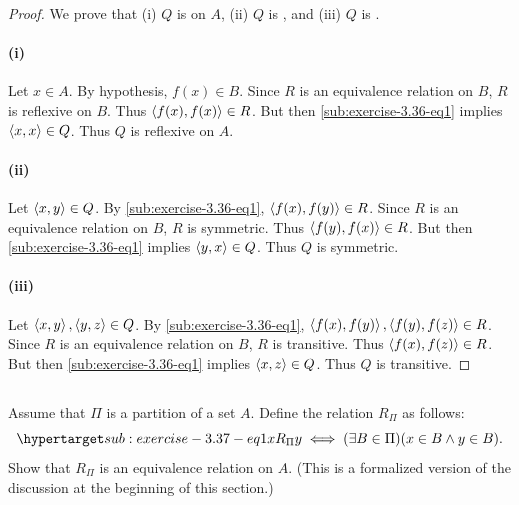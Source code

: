 \documentclass{report}
\begin{document}
  \begin{proof}
    We prove that (i) $Q$ is  on $A$, (ii) $Q$ is
      , and (iii) $Q$ is .

    \paragraph{(i)}%

      Let $x \in A$.
      By hypothesis, $f(x) \in B$.
      Since $R$ is an equivalence relation on $B$, $R$ is reflexive on $B$.
      Thus $\left< f(x), f(x) \right> \in R$.
      But then \eqref{sub:exercise-3.36-eq1} implies $\left< x, x \right> \in Q$.
      Thus $Q$ is reflexive on $A$.

    \paragraph{(ii)}%

      Let $\left< x, y \right> \in Q$.
      By \eqref{sub:exercise-3.36-eq1}, $\left< f(x), f(y) \right> \in R$.
      Since $R$ is an equivalence relation on $B$, $R$ is symmetric.
      Thus $\left< f(y), f(x) \right> \in R$.
      But then \eqref{sub:exercise-3.36-eq1} implies $\left< y, x \right> \in Q$.
      Thus $Q$ is symmetric.

    \paragraph{(iii)}%

      Let $\left< x, y \right>, \left< y, z \right> \in Q$.
      By \eqref{sub:exercise-3.36-eq1},
        $\left< f(x), f(y) \right>, \left< f(y), f(z) \right> \in R$.
      Since $R$ is an equivalence relation on $B$, $R$ is transitive.
      Thus $\left< f(x), f(z) \right> \in R$.
      But then \eqref{sub:exercise-3.36-eq1} implies $\left< x, z \right> \in Q$.
      Thus $Q$ is transitive.

  \end{proof}

\subsection{}%

  Assume that $\Pi$ is a partition of a set $A$.
  Define the relation $R_\Pi$ as follows:
    \begin{equation}
      \hyperlabel{sub:exercise-3.37-eq1}
      xR_{\Pi}y \iff (\exists B \in \Pi)(x \in B \land y \in B).
    \end{equation}
  Show that $R_\Pi$ is an equivalence relation on $A$.
  (This is a formalized version of the discussion at the beginning of this
    section.)
\end{document}
